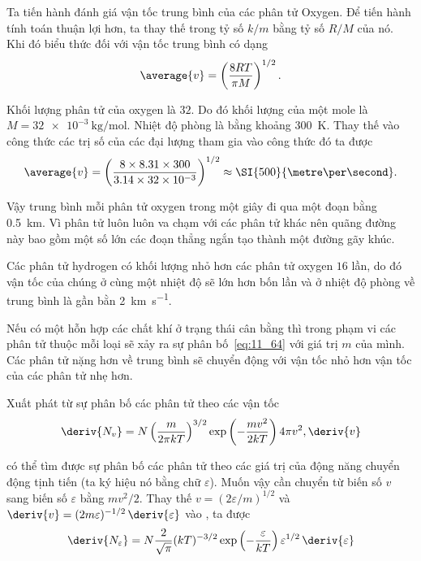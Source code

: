 Ta tiến hành đánh giá vận tốc trung bình của các phân tử Oxygen. Để tiến hành tính toán thuận lợi hơn, ta thay thế trong  tỷ số $k/m$ bằng tỷ số $R/M$ của nó. Khi đó biểu thức đối với vận tốc trung bình có dạng
\begin{equation}\label{eq:11_70}
	\average{v} = \left(\frac{8RT}{\pi M}\right)^{1/2}.
\end{equation}

\noindent

Khối lượng phân tử của oxygen là $32$. Do đó khối lượng của một mole là $M=\SI{32e-3}{\kilo\gram\per\mole}$. Nhiệt độ phòng là bằng khoảng \SI{300}{\kelvin}. Thay thế vào công thức  các trị số của các đại lượng tham gia vào công thức đó ta được 
\begin{equation*}
	\average{v} = \left(\frac{8 \times 8.31 \times 300}{3.14 \times 32\times10^{-3}}\right)^{1/2} \approx \SI{500}{\metre\per\second}.
\end{equation*}

\noindent

Vậy trung bình mỗi phân tử oxygen trong một giây đi qua một đoạn bằng \SI{0.5}{\kilo\metre}. Vì phân tử luôn luôn va chạm với các phân tử khác nên quãng đường này bao gồm một số lớn các đoạn thẳng ngắn tạo thành một đường gãy khúc.

Các phân tử hydrogen có khối lượng nhỏ hơn các phân tử oxygen $16$ lần, do đó vận tốc  của chúng ở cùng một nhiệt độ sẽ lớn hơn bốn lần và ở nhiệt độ phòng về trung bình là gần bằn \SI{2}{\kilo\metre\per\second}.

Nếu có một hỗn hợp các chất khí ở trạng thái cân bằng thì trong phạm vi các phân tử thuộc mỗi loại sẽ xảy ra sự phân bố~\eqref{eq:11_64} với giá trị $m$ của mình. Các phân tử nặng hơn về trung bình sẽ chuyển động với vận tốc nhỏ hơn vận tốc của các phân tử nhẹ hơn.


Xuất phát từ sự phân bố các phân tử theo các vận tốc
\begin{equation}\label{eq:11_71}
	\deriv{N_v} = N \left(\frac{m}{2\pi kT}\right)^{3/2} \exp\left(-\frac{mv^2}{2kT}\right) 4\pi v^2,\deriv{v}
\end{equation}

\noindent

có thể tìm được sự phân bố các phân tử theo các giá trị của động năng chuyển động tịnh tiến (ta ký hiệu nó bằng chữ $\varepsilon$). Muốn vậy cần chuyển từ biến số $v$ sang biến số $\varepsilon$ bằng $mv^2/2$. Thay thế $v=(2\varepsilon/m)^{1/2}$ và $\deriv{v}=(2m\varepsilon)^{-1/2}\,\deriv{\varepsilon}$ vào , ta được 
\begin{equation}\label{eq:11_72}
	\deriv{N_{\varepsilon}} = N \frac{2}{\sqrt{\pi}} (kT)^{-3/2} \exp\left(-\frac{\varepsilon}{kT}\right) \varepsilon^{1/2}\,\deriv{\varepsilon}
\end{equation}

